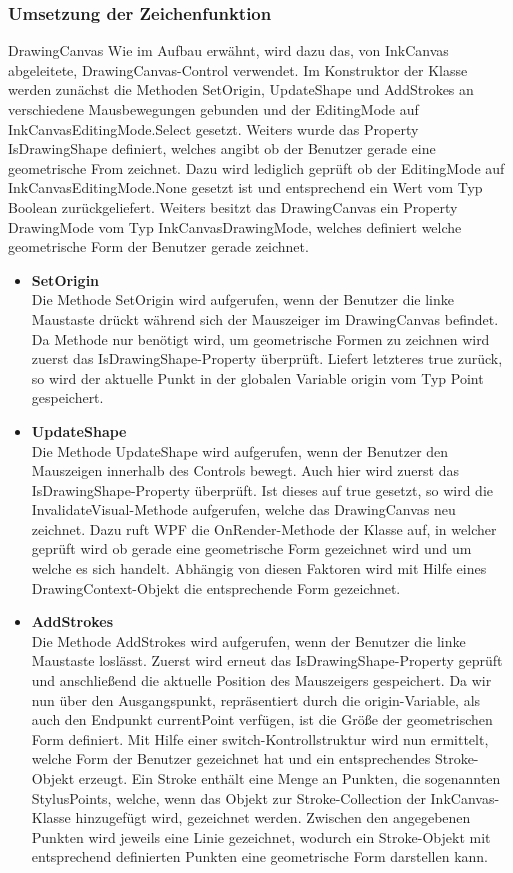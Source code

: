 \subsubsection{Umsetzung der Zeichenfunktion}

DrawingCanvas
Wie im Aufbau erwähnt, wird dazu das, von InkCanvas abgeleitete, DrawingCanvas-Control verwendet. Im Konstruktor der Klasse werden zunächst die Methoden SetOrigin, UpdateShape und AddStrokes an verschiedene Mausbewegungen gebunden und der EditingMode auf InkCanvasEditingMode.Select gesetzt. Weiters wurde das Property IsDrawingShape definiert, welches angibt ob der Benutzer gerade eine geometrische From zeichnet. Dazu wird lediglich geprüft ob der EditingMode auf InkCanvasEditingMode.None gesetzt ist und entsprechend ein Wert vom Typ Boolean zurückgeliefert. Weiters besitzt das DrawingCanvas ein Property DrawingMode vom Typ InkCanvasDrawingMode, welches definiert welche geometrische Form der Benutzer gerade zeichnet.
\begin{itemize}
\item \textbf{SetOrigin}\\
Die Methode SetOrigin wird aufgerufen, wenn der Benutzer die linke Maustaste drückt während sich der Mauszeiger im DrawingCanvas befindet. Da Methode nur benötigt wird, um geometrische Formen zu zeichnen wird zuerst das IsDrawingShape-Property überprüft. Liefert letzteres true zurück, so wird der aktuelle Punkt in der globalen Variable origin vom Typ Point gespeichert.
\item \textbf{UpdateShape}\\
Die Methode UpdateShape wird aufgerufen, wenn der Benutzer den Mauszeigen innerhalb des Controls bewegt. Auch hier wird zuerst das IsDrawingShape-Property überprüft. Ist dieses auf true gesetzt, so wird die InvalidateVisual-Methode aufgerufen, welche das DrawingCanvas neu zeichnet. Dazu ruft WPF die OnRender-Methode der Klasse auf, in welcher geprüft wird ob gerade eine geometrische Form gezeichnet wird und um welche es sich handelt. Abhängig von diesen Faktoren wird mit Hilfe eines DrawingContext-Objekt die entsprechende Form gezeichnet.
\item \textbf{AddStrokes}\\
Die Methode AddStrokes wird aufgerufen, wenn der Benutzer die linke Maustaste loslässt. Zuerst wird erneut das IsDrawingShape-Property geprüft und anschließend die aktuelle Position des Mauszeigers gespeichert. Da wir nun über den Ausgangspunkt, repräsentiert durch die origin-Variable, als auch den Endpunkt currentPoint verfügen, ist die Größe der geometrischen Form definiert.
Mit Hilfe einer switch-Kontrollstruktur wird nun ermittelt, welche Form der Benutzer gezeichnet hat und ein entsprechendes Stroke-Objekt erzeugt. Ein Stroke enthält eine Menge an Punkten, die sogenannten StylusPoints, welche, wenn das Objekt zur Stroke-Collection der InkCanvas-Klasse hinzugefügt wird, gezeichnet werden. Zwischen den angegebenen Punkten wird jeweils eine Linie gezeichnet, wodurch ein Stroke-Objekt mit entsprechend definierten Punkten eine geometrische Form darstellen kann.
\end{itemize}

